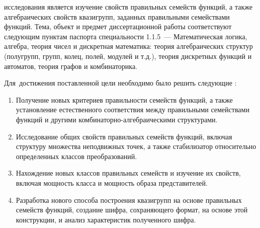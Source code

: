 {\aim} исследования является изучение свойств правильных семейств функций, а также алгебраических свойств квазигрупп, заданных правильными семействами функций.
Тема, объект и предмет диссертационной работы соответствуют следующим пунктам паспорта специальности 1.1.5~--- Математическая логика, алгебра, теория чисел и дискретная математика: теория алгебраических структур (полугрупп, групп, колец, полей, модулей и т.д.), теория дискретных функций и автоматов, теория графов и комбинаторика. 


Для~достижения поставленной цели необходимо было решить следующие {\tasks}:
\begin{enumerate}[beginpenalty=10000] %
    \item Получение новых критериев правильности семейств функций, а также установление естественного соответствия между правильными семействами функций и другими комбинаторно-алгебраическими структурами.
    \item Исследование общих свойств правильных семейств функций, включая структуру множества неподвижных точек, а также стабилизатор относительно определенных классов преобразований.
    \item Нахождение новых классов правильных семейств и изучение их свойств, включая мощность класса и мощность образа представителей.
    \item Разработка нового способа построения квазигрупп на основе правильных семейств функций, создание шифра, сохраняющего формат, на основе этой конструкции, и анализ характеристик полученного шифра.
\end{enumerate}



